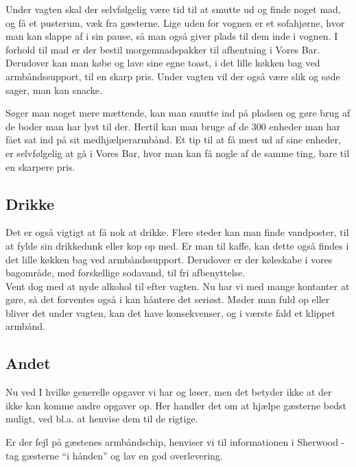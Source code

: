 Under vagten skal der selvfølgelig være tid til at smutte ud og finde noget mad, og få et 
pusterum, væk fra gæsterne. Lige uden for vognen er et sofahjørne, hvor man kan slappe af i 
sin pause, så man også giver plads til dem inde i vognen.
I forhold til mad er der bestil morgenmadspakker til afhentning i Vores Bar. 
Derudover kan man købe og lave sine egne toast, i det lille køkken bag ved armbåndssupport, 
til en skarp pris. Under vagten vil der også være slik og søde sager, man kan snacke.

Søger man noget mere mættende, kan man smutte ind på pladsen og gøre brug af de boder man har lyst til der.
Hertil kan man bruge af de 300 enheder man har fået sat ind på sit medhjælperarmbånd. Et tip til at få mest 
ud af sine enheder, er selvfølgelig at gå i Vores Bar, hvor man kan få nogle af de samme ting, bare til en 
skarpere pris.

\subsection{Drikke}

Det er også vigtigt at få nok at drikke.
Flere steder kan man finde vandposter, til at fylde sin drikkedunk eller kop op med.
Er man til kaffe, kan dette også findes i det lille køkken bag ved armbåndssupport.
Derudover er der køleskabe i vores bagområde, med forskellige sodavand, til fri 
afbenyttelse. \\

Vent dog med at nyde alkohol til efter vagten. Nu har vi med mange kontanter at gøre, 
så det forventes også i kan håntere det seriøst. 
Møder man fuld op eller bliver det under vagten, kan det have konsekvenser, og i 
værste fald et klippet armbånd.

\subsection{Andet}
\label{sec:intra:andet}

Nu ved I hvilke generelle opgaver vi har og løser, men det betyder ikke 
at der ikke kan komme andre opgaver op. Her handler det om at hjælpe gæsterne 
bedst muligt, ved bl.a. at henvise dem til de rigtige.

Er der fejl på gæstenes armbåndschip, henviser vi til informationen i Sherwood - tag gæsterne ``i hånden'' 
og lav en god overlevering.

